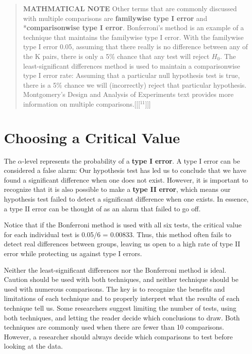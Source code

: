 \documentclass[
]{report}
\begin{document}
\begin{quote}
\textbf{MATHMATICAL NOTE} Other terms that are commonly discussed with multiple comparisons are \textbf{familywise type I error} and *\textbf{comparisonwise type I error}. Bonferroni's method is an example of a technique that maintains the familywise type I error. With the familywise type I error 0.05, assuming that there really is no difference between any of the K pairs, there is only a 5\% chance that any test will reject \(H_0\). The least-significant differences method is used to maintain a comparisonwise type I error rate: Assuming that a particular null hypothesis test is true, there is a 5\% chance we will (incorrectly) reject that particular hypothesis. Montgomery's Design and Analysis of Experiments text provides more information on multiple comparisons.{[}{[}{[}\(^{11}\){]}{]}{]}
\end{quote}

\hypertarget{choosing-a-critical-value}{%
\section*{\texorpdfstring{\textbf{Choosing a Critical Value}}{Choosing a Critical Value}}\label{choosing-a-critical-value}}

The \(\alpha\)-level represents the probability of a \textbf{type I error}. A type I error can be considered a false alarm: Our hypothesis test has led us to conclude that we have found a significant difference when one does not exist. However, it is important to recognize that it is also possible to make a \textbf{type II error}, which means our hypothesis test failed to detect a significant difference when one exists. In essence, a type II error can be thought of as an alarm that failed to go off.

Notice that if the Bonferroni method is used with all six tests, the critical value for each individual test is 0.05/6 = 0.00833. Thus, this method often fails to detect real differences between groups, leaving us open to a high rate of type II error while protecting us against type I errors.

Neither the least-significant differences nor the Bonferroni method is ideal. Caution should be used with both techniques, and neither technique should be used with numerous comparisons. The key is to recognize the benefits and limitations of each technique and to properly interpret what the results of each technique tell us. Some researchers suggest limiting the number of tests, using both techniques, and letting the reader decide which conclusions to draw. Both techniques are commonly used when there are fewer than 10 comparisons. However, a researcher should always decide which comparisons to test before looking at the data.
\end{document}
